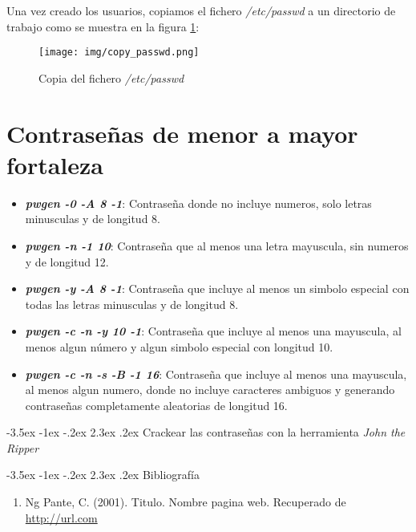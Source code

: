 \documentclass[11pt]{report}
\makeatletter
\renewcommand\chapter{\@startsection{chapter}{0}{\z@}%
    {-3.5ex \@plus -1ex \@minus -.2ex}%
    {2.3ex \@plus.2ex}%
    {\normalfont\Large\bfseries}}
\makeatother
\begin{document}
Una vez creado los usuarios, copiamos el fichero \emph{/etc/passwd} a un directorio de trabajo como se muestra en la figura \ref{fig:copia del fichero /etc/passwd}:
\begin{figure}[H]
  \centering
  \texttt{[image: img/copy\_passwd.png]}
  \caption{Copia del fichero \emph{/etc/passwd}}
  \label{fig:copia del fichero /etc/passwd}
\end{figure}

\section{Contraseñas de menor a mayor fortaleza}
\begin{itemize}
  \item \textbf{\emph{pwgen -0 -A 8 -1}}: Contraseña donde no incluye numeros, solo letras minusculas y de longitud 8.
  \item \textbf{\emph{pwgen -n -1 10}}: Contraseña que al menos una letra mayuscula, sin numeros y de longitud 12.
  \item \textbf{\emph{pwgen -y -A 8 -1}}: Contraseña que incluye al menos un simbolo especial con todas las letras minusculas y de longitud 8.
  \item \textbf{\emph{pwgen -c -n -y 10 -1}}: Contraseña que incluye al menos una mayuscula, al menos algun número y algun simbolo especial con longitud 10.
  \item \textbf{\emph{pwgen -c -n -s -B -1 16}}: Contraseña que incluye al menos una mayuscula, al menos algun numero, donde no incluye caracteres ambiguos y 
  generando contraseñas completamente aleatorias de longitud 16.
\end{itemize}

\cleardoublepage

\chapter{Crackear las contraseñas con la herramienta \emph{John the Ripper}}

\cleardoublepage

\chapter{Bibliografía} %
\begin{enumerate}
\item Ng Pante, C. (2001). Titulo. Nombre pagina web. Recuperado de \url{http://url.com}

\end{enumerate}
\end{document}
